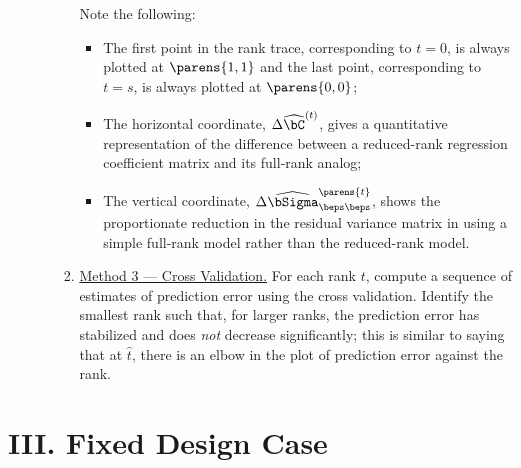 \documentclass[12pt]{article}
\begin{document}
\begin{enumerate}[label=\textbf{\arabic*.}]
\begin{enumerate}
\begin{enumerate}
			Note the following: 
			\begin{itemize}
				\item The first point in the rank trace, corresponding to $t = 0$, is always plotted at $\parens{1, 1}$ and the last point, corresponding to $t = s$, is always plotted at $\parens{0, 0}$; 
				\item The horizontal coordinate, $\Delta \widehat{\bC}^{(t)}$, gives a quantitative representation of the difference between a reduced-rank regression coefficient matrix and its full-rank analog; 
				\item The vertical coordinate, $\Delta \widehat{\bSigma}_{\beps \beps}^{\parens{t}}$, shows the proportionate reduction in the residual variance matrix in using a simple full-rank model rather than the reduced-rank model. 

			\end{itemize}
			
			\item \underline{Method 3 --- Cross Validation.} For each rank $t$, compute a sequence of estimates of prediction error using the cross validation. Identify the smallest rank such that, for larger ranks, the prediction error has stabilized and does \textit{not} decrease significantly; this is similar to saying that at $\hat{t}$, there is an elbow in the plot of prediction error against the rank. 
		\end{enumerate}
	
	\end{enumerate}
	   
\end{enumerate}


\section*{III. Fixed Design Case}
\end{document}
